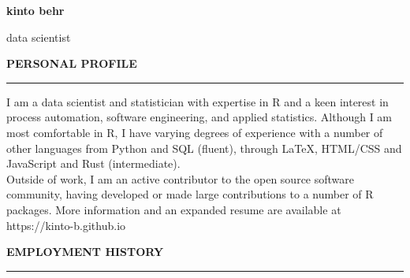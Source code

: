 \documentclass[10pt]{article}
\begin{document}
\lsstyle

\pagecolor{skyblue}

\newcommand{\stub}{\textcolor{skyblue}{\rule{3cm}{3mm}}}

\begin{huge}\begin{center}{\bf kinto behr}\end{center}\end{huge}
\begin{Large}\begin{center}{data scientist}\end{center}\end{Large}
\vspace{1cm}

\begin{large}
{\bf PERSONAL PROFILE} \\
\textcolor{gray}{\rule{2cm}{2mm}}
\end{large}
\vspace{5pt}

\begin{small}
I am a data scientist and statistician with expertise in R and a keen interest in process automation, software engineering, and applied statistics. Although I am most comfortable in R, I have varying degrees of experience with a number of other languages from Python and SQL (fluent), through LaTeX, HTML/CSS and JavaScript and Rust (intermediate). \\

Outside of work, I am an active contributor to the open source software community, having developed or made large contributions to a number of R packages. More information and an expanded resume are available at https://kinto-b.github.io

\end{small}

\vspace{1cm}
\begin{large}
{\bf EMPLOYMENT HISTORY} \\
\textcolor{gray}{\rule{2cm}{2mm}}
\end{large}
\vspace{5pt}
\end{document}
